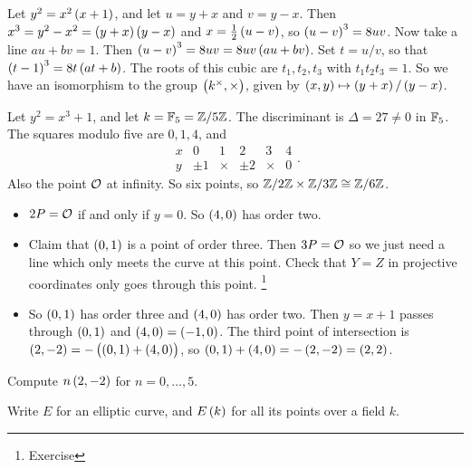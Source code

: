 \begin{example}
Let $ y^2 = x^2\br{x + 1} $, and let $ u = y + x $ and $ v = y - x $. Then $ x^3 = y^2 - x^2 = \br{y + x}\br{y - x} $ and $ x = \tfrac{1}{2}\br{u - v} $, so $ \br{u - v}^3 = 8uv $. Now take a line $ au + bv = 1 $. Then $ \br{u - v}^3 = 8uv = 8uv\br{au + bv} $. Set $ t = u / v $, so that $ \br{t - 1}^3 = 8t\br{at + b} $. The roots of this cubic are $ t_1, t_2, t_3 $ with $ t_1t_2t_3 = 1 $. So we have an isomorphism to the group $ \br{k^\times, \times} $, given by $ \br{x, y} \mapsto \br{y + x} / \br{y - x} $.
\end{example}

\begin{example}
Let $ y^2 = x^3 + 1 $, and let $ k = \mathbb{F}_5 = \mathbb{Z} / 5\mathbb{Z} $. The discriminant is $ \Delta = 27 \ne 0 $ in $ \mathbb{F}_5 $. The squares modulo five are $ 0, 1, 4 $, and
$$
\begin{array}{c|c|c|c|c|c}
x & 0 & 1 & 2 & 3 & 4 \\
\hline
y & \pm 1 & \times & \pm 2 & \times & 0
\end{array}.
$$
Also the point $ \mathcal{O} $ at infinity. So six points, so $ \mathbb{Z} / 2\mathbb{Z} \times \mathbb{Z} / 3\mathbb{Z} \cong \mathbb{Z} / 6\mathbb{Z} $.
\begin{itemize}
\item $ 2P = \mathcal{O} $ if and only if $ y = 0 $. So $ \br{4, 0} $ has order two.
\item Claim that $ \br{0, 1} $ is a point of order three. Then $ 3P = \mathcal{O} $ so we just need a line which only meets the curve at this point. Check that $ Y = Z $ in projective coordinates only goes through this point. \footnote{Exercise}
\item So $ \br{0, 1} $ has order three and $ \br{4, 0} $ has order two. Then $ y = x + 1 $ passes through $ \br{0, 1} $ and $ \br{4, 0} = \br{-1, 0} $. The third point of intersection is $ \br{2, -2} = -\br{\br{0, 1} + \br{4, 0}} $, so $ \br{0, 1} + \br{4, 0} = -\br{2, -2} = \br{2, 2} $.
\end{itemize}
\end{example}

\begin{exercise}
Compute $ n\br{2, -2} $ for $ n = 0, \dots, 5 $.
\end{exercise}

\begin{notation}
Write $ E $ for an elliptic curve, and $ E\br{k} $ for all its points over a field $ k $.
\end{notation}

